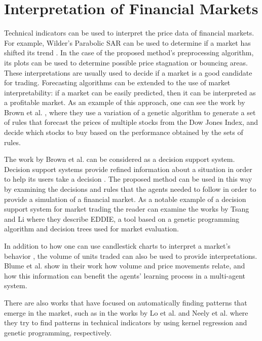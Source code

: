 \section{Interpretation of Financial Markets}
\label{section:interpretation-of-financial-markets}

Technical indicators can be used to interpret the price data of financial
markets. For example, Wilder's Parabolic SAR can be used to determine if a
market has shifted its trend \cite{Wilder1978}. In the case of the proposed
method's preprocessing algorithm, its plots can be used to determine possible
price stagnation or bouncing areas. These interpretations are usually used to
decide if a market is a good candidate for trading. Forecasting algorithms can
be extended to the use of market interpretability: if a market can be easily
predicted, then it can be interpreted as a profitable market. As an example of
this approach, one can see the work by Brown et al. \cite{Brown2013}, where
they use a variation of a genetic algorithm to generate a set of rules that
forecast the prices of multiple stocks from the Dow Jones Index, and decide
which stocks to buy based on the performance obtained by the sets of rules.

The work by Brown et al. can be considered as a decision support
system. Decision support systems provide refined information about a situation
in order to help its users take a decision \cite{Keen1980}. The proposed method
can be used in this way by examining the decisions and rules that the agents
needed to follow in order to provide a simulation of a financial market. As a
notable example of a decision support system for market trading the reader can
examine the works by Tsang and Li \cite{Tsang2004} \cite{tsang1998eddie} where
they describe EDDIE, a tool based on a genetic programming algorithm and
decision trees used for market evaluation.

In addition to how one can use candlestick charts to interpret a market's
behavior \cite{Nison1991}, the volume of units traded can also be used to
provide interpretations. Blume et al. \cite{Blume1994} show in their work how
volume and price movements relate, and how this information can benefit the
agents' learning process in a multi-agent system.

There are also works that have focused on automatically finding patterns that
emerge in the market, such as in the works by Lo et al. \cite{Lo2000} and Neely
et al. \cite{Neely1997} where they try to find patterns in technical indicators
by using kernel regression and genetic programming, respectively.

